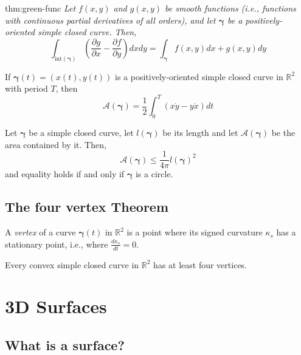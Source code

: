 \documentclass{notes}
\newcommand{\bgamma}{\bm{\gamma}}
\begin{document}
\begin{theorem}{thm:green-func}
\textit{Let $f (x, y)$ and $g(x, y)$ be smooth functions (i.e., functions
	with continuous partial derivatives of all orders), and let \(\bgamma\) be a positively-
	oriented simple closed curve. Then,}
\[\int_{\mathrm{int}(\bgamma)} \left(\dfrac{\partial g}{\partial x} -\dfrac{\partial f}{\partial y} \right)dxdy = \int_{\bgamma} f(x, y) dx + g(x, y)dy\]
\end{theorem}

\begin{proposition}{}
	If \(\bgamma(t) = (x(t), y(t))\) is a positively-oriented simple closed curve in \(\mathbb{R}^2\) with 
	period \(T\), then 
	\[\mathcal{A}(\bgamma) = \frac{1}{2} \int_{0}^{T} (x \dot{y} - y \dot{x}) dt\]
\end{proposition}

\begin{theorem}{}
	Let \(\bgamma\) be a simple closed curve, let \(l(\bgamma)\) be its length and let \(\mathcal{A}(\bgamma)\) be the area
	contained by it. Then,
	\[\mathcal{A}(\bgamma) \leq \frac{1}{4\pi} l(\bgamma) ^2\]
	and equality holds if and only if \(\bgamma\) is a circle.
\end{theorem}
\section{The four vertex Theorem}

\begin{definition}[Vertex]{}
	A \textit{vertex }of a curve \(\bgamma(t)\) in \(\mathbb{R}^2\) is a point where its signed curvature \(\kappa_s\) has a stationary point, i.e., where 
	\(\frac{d \kappa_s}{d t} = 0\).
\end{definition}

\begin{theorem}{}
	Every convex simple closed curve in \(\mathbb{R}^2\) has at least four vertices.
\end{theorem}


\chapter{3D Surfaces}
\section{What is a surface?}
\end{document}
